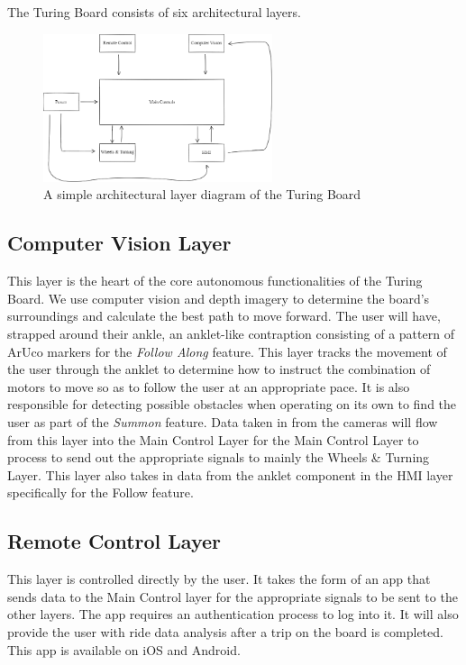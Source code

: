The Turing Board consists of six architectural layers.

\begin{figure}[h!]
	\centering
 	\includegraphics[width=0.60\textwidth]{images/Introdcution_Layers.png}
 \caption{A simple architectural layer diagram of the Turing Board}
\end{figure}

\subsection{Computer Vision Layer}
This layer is the heart of the core autonomous functionalities of the Turing Board. We use computer vision and depth imagery to determine the board's surroundings and calculate the best path to move forward. The user will have, strapped around their ankle, an anklet-like contraption consisting of a pattern of ArUco markers for the \textit{Follow Along} feature. This layer tracks the movement of the user through the anklet to determine how to instruct the combination of motors to move so as to follow the user at an appropriate pace. It is also responsible for detecting possible obstacles when operating on its own to find the user as part of the \textit{Summon} feature. 
Data taken in from the cameras will flow from this layer into the Main Control Layer for the Main Control Layer to process to send out the appropriate signals to mainly the Wheels \& Turning Layer. This layer also takes in data from the anklet component in the HMI layer specifically for the Follow feature.

\subsection{Remote Control Layer}
This layer is controlled directly by the user. It takes the form of an app that sends data to the Main Control layer for the appropriate signals to be sent to the other layers. The app requires an authentication process to log into it. It will also provide the user with ride data analysis after a trip on the board is completed. This app is available on iOS and Android.


